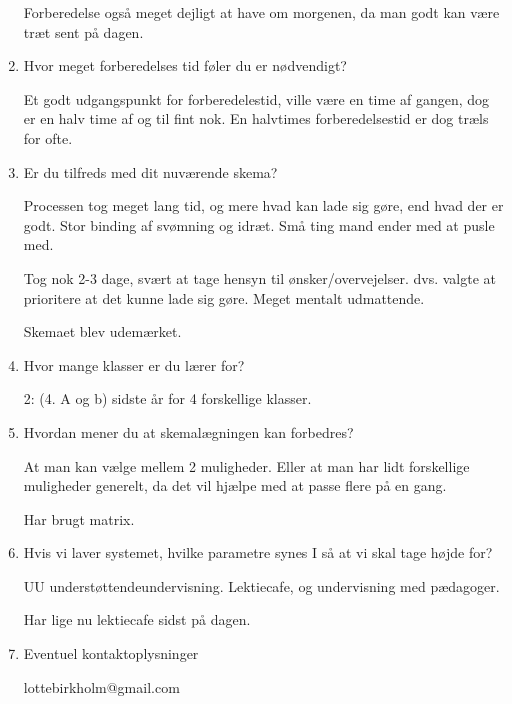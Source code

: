 \begin{enumerate}
	Forberedelse også meget dejligt at have om morgenen, da man godt kan være træt sent på dagen.
    
    
    \item Hvor meget forberedelses tid føler du er nødvendigt?
	
	Et godt udgangspunkt for forberedelestid, ville være en time af gangen, dog er en halv time af og til fint nok. En halvtimes forberedelsestid er dog træls for ofte.


    \item Er du tilfreds med dit nuværende skema?
	
	Processen tog meget lang tid, og mere hvad kan lade sig gøre, end hvad der er godt. Stor binding af svømning og idræt. Små ting mand ender med at pusle med.
	
	Tog nok 2-3 dage, svært at tage hensyn til ønsker/overvejelser. dvs. valgte at prioritere at det kunne lade sig gøre. Meget mentalt udmattende.
	
	Skemaet blev udemærket.
    
    
    \item Hvor mange klasser er du lærer for?
	
	2: (4. A og b) sidste år for 4 forskellige klasser. 
    
    
    \item Hvordan mener du at skemalægningen kan forbedres?
	
	At man kan vælge mellem 2 muligheder. Eller at man har lidt forskellige muligheder generelt, da det vil hjælpe med at passe flere på en gang. 
	
	Har brugt matrix. 
    
    
    \item Hvis vi laver systemet, hvilke parametre synes I så at vi skal tage højde for?
	
	UU understøttendeundervisning. Lektiecafe, og undervisning med pædagoger.
	
	Har lige nu lektiecafe sidst på dagen.  
    
    
    \item Eventuel kontaktoplysninger
	
	lottebirkholm@gmail.com
\end{enumerate}
